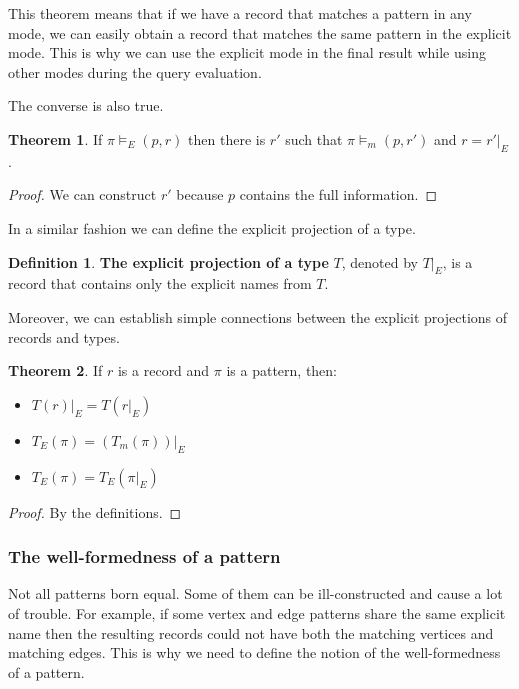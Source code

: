 \documentclass[14pt]{constructor-thesis}
\theoremstyle{definition}
\newtheorem*{theorem}{Theorem}
\newtheorem*{definition}{Definition}
\begin{document}
This theorem means that if we have a record that matches a pattern in any mode, we can easily obtain a record that matches the same pattern in the explicit mode. This is why we can use the explicit mode in the final result while using other modes during the query evaluation.

The converse is also true.
\begin{theorem}
  If $\pi \models_E (p, r)$ then there is $r'$ such that $\pi \models_m (p, r')$ and $r = r'|_E$.
\end{theorem}
\begin{proof}
  We can construct $r'$ because $p$ contains the full information.
\end{proof}

In a similar fashion we can define the explicit projection of a type.
\begin{definition}
  \textbf{The explicit projection of a type} $T$, denoted by $T |_E$, is a record that contains only the explicit names from $T$.
\end{definition}

Moreover, we can establish simple connections between the explicit projections of records and types.
\begin{theorem} If $r$ is a record and $\pi$ is a pattern, then:
  \begin{itemize}
    \item $T(r)|_E = T(r|_E)$
    \item $T_E(\pi) = (T_m(\pi)) |_E$
    \item $T_E(\pi) = T_E(\pi |_E)$
  \end{itemize}
\end{theorem}
\begin{proof}
  By the definitions.
\end{proof}


\subsubsection{The well-formedness of a pattern}

Not all patterns born equal. Some of them can be ill-constructed and cause a lot of trouble. For example, if some vertex and edge patterns share the same explicit name then the resulting records could not have both the matching vertices and matching edges. This is why we need to define the notion of the well-formedness of a pattern.
\end{document}
